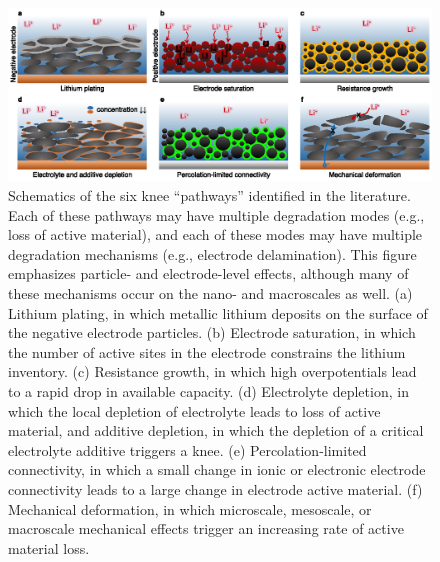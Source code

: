 \documentclass[journal=jpclcd,manuscript=article]{achemso}
\begin{document}
\begin{figure}[h!tb]
\centering
\includegraphics[scale=0.9]{figures/knee_pathways_v2.eps}
\caption{Schematics of the six knee ``pathways'' identified in the literature. Each of these pathways may have multiple degradation modes (e.g., loss of active material), and each of these modes may have multiple degradation mechanisms (e.g., electrode delamination). This figure emphasizes particle- and electrode-level effects, although many of these mechanisms occur on the nano- and macroscales as well.
(a) Lithium plating, in which metallic lithium deposits on the surface of the negative electrode particles.
(b) Electrode saturation, in which the number of active sites in the electrode constrains the lithium inventory.
(c) Resistance growth, in which high overpotentials lead to a rapid drop in available capacity.
(d) Electrolyte depletion, in which the local depletion of electrolyte leads to loss of active material, and additive depletion, in which the depletion of a critical electrolyte additive triggers a knee.
(e) Percolation-limited connectivity, in which a small change in ionic or electronic electrode connectivity leads to a large change in electrode active material.
(f) Mechanical deformation, in which microscale, mesoscale, or macroscale mechanical effects trigger an increasing rate of active material loss.}
\label{fig:knee_pathways}
\end{figure}
\end{document}
